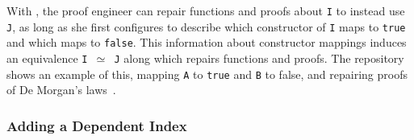 With \toolname, the proof engineer can repair functions and proofs about \lstinline{I} to instead use \lstinline{J},
as long as she first configures \toolname to describe which constructor 
of \lstinline{I} maps to \lstinline{true} and which maps to \lstinline{false}.
This information about constructor mappings induces an equivalence \lstinline{I }$\simeq$\lstinline{ J}
along which \toolname repairs functions and proofs.
The repository shows an example of this, mapping \lstinline{A} to \lstinline{true} and \lstinline{B} to false,
and repairing proofs of De Morgan's laws~. %
%

%

\subsubsection*{Adding a Dependent Index}
\label{sec:ex2}

